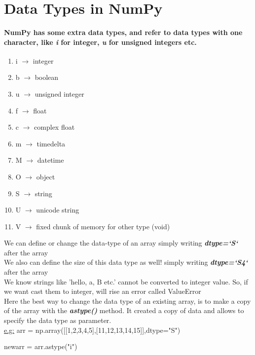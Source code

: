 \documentclass[openany]{book}
\begin{document}
\section{Data Types in NumPy}

\paragraph{NumPy has some extra data types, and refer to data types with one character, like \textit{i} for integer, \textit{u} for unsigned integers etc.}

\begin{enumerate}
    \item i $\rightarrow$ integer
    \item b $\rightarrow$ boolean
    \item u $\rightarrow$ unsigned integer
    \item f $\rightarrow$ float
    \item c $\rightarrow$ complex float
    \item m $\rightarrow$ timedelta
    \item M $\rightarrow$ datetime
    \item O $\rightarrow$ object
    \item S $\rightarrow$ string
    \item U $\rightarrow$ unicode string
    \item V $\rightarrow$ fixed chunk of memory for other type (void)
\end{enumerate}

We can define or change the data-type of an array simply writing \textbf{\textit{dtype=`S`}} after the array \\
We also can define the size of this data type as well! simply writing \textbf{\textit{dtype=`S4`}} after the array \\
We know strings like 'hello, a, B etc.' cannot be converted to integer value. So, if we want cast them to integer, will rise an error called ValueError \\

Here the best way to change the data type of an existing array, is to make a copy of the array with the \textbf{\textit{astype()}} method. It created a copy of data and allows to specify the data type as parameter.\\
 \underline{e.g:} arr = np.array([[1,2,3,4,5],[11,12,13,14,15]],dtype="S") 

newarr = arr.astype("i")
\end{document}
